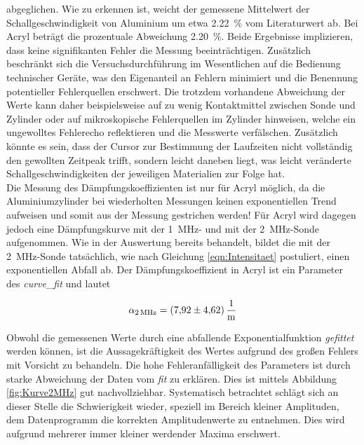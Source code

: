 \noindent abgeglichen. Wie zu erkennen ist, weicht der gemessene Mittelwert der Schallgeschwindigkeit von Aluminium um etwa \qty{2.22}{\percent}
vom Literaturwert ab. Bei Acryl beträgt die prozentuale Abweichung \qty{2.20}{\percent}. Beide Ergebnisse implizieren, dass 
keine signifikanten Fehler die Messung beeinträchtigen. Zusätzlich beschränkt sich die Versuchsdurchführung im Wesentlichen auf 
die Bedienung technischer Geräte, was den Eigenanteil an Fehlern minimiert und die Benennung potentieller Fehlerquellen
erschwert. Die trotzdem vorhandene Abweichung der Werte kann daher beispielsweise auf zu wenig Kontaktmittel zwischen Sonde 
und Zylinder oder auf mikroskopische Fehlerquellen im Zylinder hinweisen, welche ein ungewolltes Fehlerecho reflektieren 
und die Messwerte verfälschen. Zusätzlich könnte es sein, dass der Cursor zur Bestimmung der Laufzeiten nicht vollständig den 
gewollten Zeitpeak trifft, sondern leicht daneben liegt, was leicht veränderte Schallgeschwindigkeiten der jeweiligen 
Materialien zur Folge hat.\\

\noindent Die Messung des Dämpfungskoeffizienten ist nur für Acryl möglich, da die Aluminiumzylinder bei wiederholten Messungen keinen 
exponentiellen Trend aufweisen und somit aus der Messung gestrichen werden! Für Acryl wird dagegen jedoch eine Dämpfungskurve 
mit der \qty{1}{\mega\hertz}- und mit der \qty{2}{\mega\hertz}-Sonde aufgenommen. Wie in der Auswertung bereits behandelt, bildet
die mit der \qty{2}{\mega\hertz}-Sonde tatsächlich, wie nach Gleichung \eqref{eqn:Intensitaet} postuliert, einen exponentiellen 
Abfall ab. Der Dämpfungskoeffizient in Acryl ist ein Parameter des \emph{curve\_fit} und lautet 

\begin{align*}
    \alpha_{\qty{2}{\mega\hertz}} = \qty{7.92\pm4.62}{\per\meter}
\end{align*}

\noindent Obwohl die gemessenen Werte durch eine abfallende Exponentialfunktion \emph{gefittet} werden können, ist die 
Aussagekräftigkeit des Wertes aufgrund des großen Fehlers mit Vorsicht zu behandeln. Die hohe Fehleranfälligkeit des Parameters
ist durch starke Abweichung der Daten vom \emph{fit} zu erklären. Dies ist mittels Abbildung \ref{fig:Kurve2MHz} gut nachvollziehbar.
Systematisch betrachtet schlägt sich an dieser Stelle die Schwierigkeit wieder, speziell im Bereich kleiner Amplituden, dem 
Datenprogramm die korrekten Amplitudenwerte zu entnehmen. Dies wird aufgrund mehrerer immer kleiner werdender Maxima erschwert.\\

